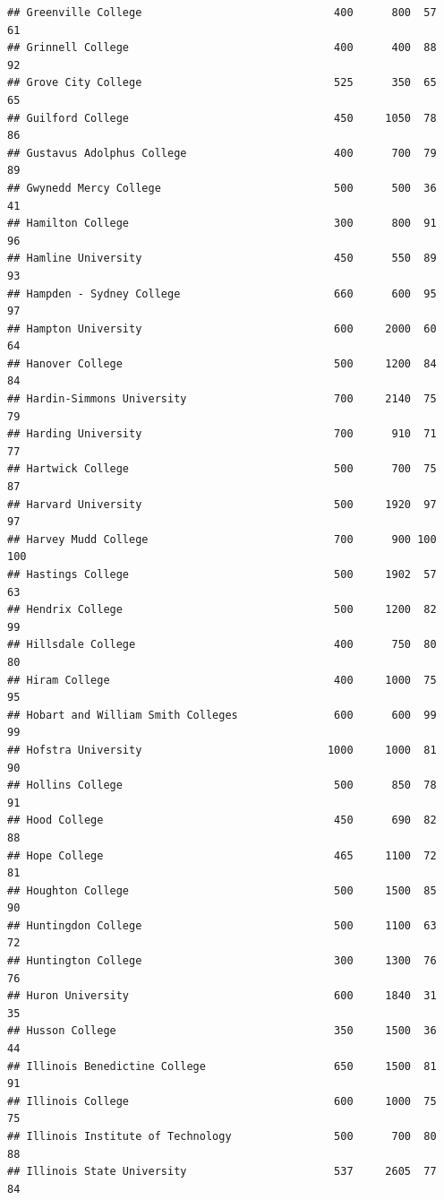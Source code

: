\documentclass[
]{article}
\begin{document}
\begin{verbatim}
## Greenville College                              400      800  57       61
## Grinnell College                                400      400  88       92
## Grove City College                              525      350  65       65
## Guilford College                                450     1050  78       86
## Gustavus Adolphus College                       400      700  79       89
## Gwynedd Mercy College                           500      500  36       41
## Hamilton College                                300      800  91       96
## Hamline University                              450      550  89       93
## Hampden - Sydney College                        660      600  95       97
## Hampton University                              600     2000  60       64
## Hanover College                                 500     1200  84       84
## Hardin-Simmons University                       700     2140  75       79
## Harding University                              700      910  71       77
## Hartwick College                                500      700  75       87
## Harvard University                              500     1920  97       97
## Harvey Mudd College                             700      900 100      100
## Hastings College                                500     1902  57       63
## Hendrix College                                 500     1200  82       99
## Hillsdale College                               400      750  80       80
## Hiram College                                   400     1000  75       95
## Hobart and William Smith Colleges               600      600  99       99
## Hofstra University                             1000     1000  81       90
## Hollins College                                 500      850  78       91
## Hood College                                    450      690  82       88
## Hope College                                    465     1100  72       81
## Houghton College                                500     1500  85       90
## Huntingdon College                              500     1100  63       72
## Huntington College                              300     1300  76       76
## Huron University                                600     1840  31       35
## Husson College                                  350     1500  36       44
## Illinois Benedictine College                    650     1500  81       91
## Illinois College                                600     1000  75       75
## Illinois Institute of Technology                500      700  80       88
## Illinois State University                       537     2605  77       84

\end{verbatim}
\end{document}
